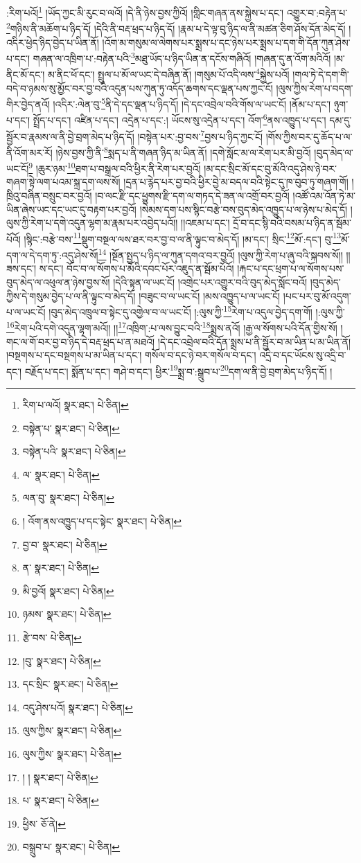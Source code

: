 :རིག་པའོ།\footnote{རིག་པ་ལའོ།  སྣར་ཐང་།  པེ་ཅིན། } །ཡོད་ཀྱང་མི་རུང་བ་ལའོ། །དེ་ནི་ཉེས་བྱས་ཀྱིའོ། །གླིང་གཞན་ནས་སྐྱེས་པ་དང་། འགྱུར་བ་:བརྟེན་པ་\footnote{བསྟེན་པ་  སྣར་ཐང་།  པེ་ཅིན། }གཉིས་ནི་མཆོག་པ་ཉིད་དོ། །དེའི་ནི་བརྡ་ཕྲད་པ་ཉིད་དོ། །རྣམ་པ་དེ་ལྟ་བུ་ཉིད་ལ་ནི་མཚན་ཅིག་ཤོས་དོན་མེད་དོ། །འདིར་ཕྱེད་ཉིད་བྱེད་པ་ཡིན་ནོ། །འོག་མ་གསུམ་ལ་ལེགས་པར་སྨྲས་པ་དང་ཉེས་པར་སྨྲས་པ་དག་གི་དོན་ཀུན་ཤེས་པ་དང་། གཞན་ལ་འཁྲིག་པ་:བརྟེན་པའི་\footnote{བསྟེན་པའི་  སྣར་ཐང་།  པེ་ཅིན། }མཐུ་ཡོད་པ་ཉིད་ཡིན་ན་དངོས་གཞིའོ། །གཞན་དུ་ན་འོག་མའིའོ། །མ་ནིང་མོ་དང་། མ་ནིང་ཕོ་དང་། སྤྲུལ་པ་མོ་ལ་ཡང་དེ་བཞིན་ནོ། །གསུམ་པོ་འདི་ལས་\footnote{ལ་  སྣར་ཐང་།  པེ་ཅིན། }སྐྱེས་པའོ། །གལ་ཏེ་དེ་དག་གི་བདེ་བ་ཉམས་སུ་མྱོང་བར་བྱ་བའི་འདུན་པས་ཀུན་ཏུ་འདོད་ཆགས་དང་ལྡན་པས་ཀྱང་ངོ། །ལུས་ཀྱིས་རེག་པ་བདག་གིར་བྱེད་ནའོ། །འདིར་:ལེན་བུ་\footnote{ལན་བུ་  སྣར་ཐང་།  པེ་ཅིན། }ནི་དེ་དང་ལྡན་པ་ཉིད་དོ། །དེ་དང་འབྲེལ་བའི་གོས་ལ་ཡང་ངོ། །ནོམ་པ་དང་། ཉུག་པ་དང་། སྤྲོད་པ་དང་། འཛིན་པ་དང་། འདྲེན་པ་དང་:། ཡོངས་སུ་འདྲེན་པ་དང་། འོག་\footnote{།  འོག་ནས་འཁྱུད་པ་དང་སྟེང་  སྣར་ཐང་།  པེ་ཅིན། }ནས་འཁྱུད་པ་དང་། དམ་དུ་སྦྱོར་བ་རྣམས་ལ་ནི་བྱེ་བྲག་མེད་པ་ཉིད་དོ། །བསྟེན་པར་:བྱ་བས་\footnote{བྱ་བ་  སྣར་ཐང་།  པེ་ཅིན། }བྱས་པ་ཉིད་ཀྱང་ངོ། །གོས་ཀྱིས་བར་དུ་ཆོད་པ་ལ་ནི་འོག་མར་རོ། །ཉེས་བྱས་ཀྱི་ནི་\footnote{ན་  སྣར་ཐང་།  པེ་ཅིན། }སྨད་པ་ནི་གཞན་ཉིད་མ་ཡིན་ནོ། །དགེ་སློང་མ་ལ་རེག་པར་མི་བྱའོ། །བུད་མེད་ལ་ཡང་ངོ།\footnote{མི་བྱའོ།  སྣར་ཐང་།  པེ་ཅིན། } །ཆུར་ཉམ་\footnote{ཉམས་  སྣར་ཐང་།  པེ་ཅིན། }ཐག་པ་བསྒྲལ་བའི་ཕྱིར་ནི་རེག་པར་བྱའོ། །མ་དང་སྲིང་མོ་དང་བུ་མོའི་འདུ་ཤེས་ཉེ་བར་གཞག་སྟེ་ལག་པའམ་སྐྲ་དག་ལས་སོ། །དྲན་པ་རྙེད་པར་བྱ་བའི་ཕྱིར་བྱེ་མ་བདལ་བའི་སྟེང་དུ་ཁ་བུབ་ཏུ་གཞག་གོ། །ཁྲིའུ་བཞིན་བསྲུང་བར་བྱའོ། །བ་ལང་རྫི་དང་ཕྱུགས་རྫི་དག་ལ་གཏད་དེ་ཟན་ལ་འགྲོ་བར་བྱའོ། །འཚོ་འམ་འོན་ཏེ་མ་ཡིན་ཞེས་ཡང་དང་ཡང་དུ་བརྟག་པར་བྱའོ། །སེམས་དག་པས་སྙིང་བརྩེ་བས་བུད་མེད་འཁྱུད་པ་ལ་ཉེས་པ་མེད་དོ། །ལུས་ཀྱི་རེག་པ་དགེ་འདུན་ལྷག་མ་རྣམ་པར་འབྱེད་པའོ།། །།འཇམ་པ་དང་། དྲོ་བ་དང་སྙི་བའི་བསམ་པ་ཉིད་ན་སྦོམ་པོའོ། །སྙིང་:བརྩེ་བས་\footnote{རྩེ་བས་  པེ་ཅིན། }སྡུག་བསྔལ་ལས་ཐར་བར་བྱ་བ་ལ་ནི་ལྟུང་བ་མེད་དོ། །མ་དང་། སྲིང་\footnote{།བུ་  སྣར་ཐང་།  པེ་ཅིན། }མོ་:དང་། བུ་\footnote{དང་སྲིང་  སྣར་ཐང་།  པེ་ཅིན། }མོ་དག་ལ་དེ་དག་ཏུ་:འདུ་ཤེས་སོ།\footnote{འདུ་ཤེས་པའོ།  སྣར་ཐང་།  པེ་ཅིན། } །སྔོན་སྤྱད་པ་ཉིད་ལ་ཀུན་དགའ་བར་བྱའོ། །ལུས་ཀྱི་རེག་པ་ཞུ་བའི་སྐབས་སོ།། །།ཟས་དང་། ས་དང་། བོང་བ་ལ་སོགས་པ་མོའི་དབང་པོར་འཇུད་ན་སྦོམ་པོའོ། །རྐང་པ་དང་ཕྲག་པ་ལ་སོགས་པས་བུད་མེད་ལ་འཕུལ་ན་ཉེས་བྱས་སོ། །དེའི་སྟན་ལ་ཡང་ངོ། །འགྲེང་པར་འགྱུར་བའི་བུད་མེད་སློང་བའོ། །བུད་མེད་ཀྱིས་དེ་གསུམ་བྱེད་པ་ལ་ནི་ལྟུང་བ་མེད་དོ། །བཟུང་བ་ལ་ཡང་ངོ། །མས་འཁྱུད་པ་ལ་ཡང་ངོ། །པང་པར་བུ་མོ་འདུག་པ་ལ་ཡང་ངོ། །བུད་མེད་འཁྲུལ་བ་སྟེང་དུ་འགྱེལ་བ་ལ་ཡང་ངོ། །:ལུས་ཀྱི་\footnote{ལུས་ཀྱིས་  སྣར་ཐང་།  པེ་ཅིན། }རེག་པ་འདུལ་བྱེད་དག་གོ། །:ལུས་ཀྱི་\footnote{ལུས་ཀྱིས་  སྣར་ཐང་།  པེ་ཅིན། }རེག་པའི་དགེ་འདུན་ལྷག་མའོ།། །།\footnote{། །  སྣར་ཐང་།  པེ་ཅིན། }འཁྲིག་:པ་ལས་བྱུང་བའི་\footnote{པ་  སྣར་ཐང་།  པེ་ཅིན། }སྨྲས་ནའོ། །རྒྱ་ལ་སོགས་པའི་དོན་གྱིས་སོ། །གང་ལ་གོ་བར་བྱ་བ་ཉིད་དེ་བརྡ་ཕྲད་པ་ན་མཐའོ། །དེ་དང་འབྲེལ་བའི་དོན་སྨྲས་པ་ནི་སྦྱོར་བ་མ་ཡིན་པ་མ་ཡིན་ནོ། །བསྔགས་པ་དང་བསྔགས་པ་མ་ཡིན་པ་དང་། གསོལ་བ་དང་ཉེ་བར་གསོལ་བ་དང་། འདྲི་བ་དང་ཡོངས་སུ་འདྲི་བ་དང་། བརྗོད་པ་དང་། སྨོན་པ་དང་། གཤེ་བ་དང་། ཕྱིར་\footnote{ཕྱིས་  ཅོ་ནེ། }སྨྲ་བ་:སྒྲུབ་པ་\footnote{བསྒྲུབ་པ་  སྣར་ཐང་།  པེ་ཅིན། }དག་ལ་ནི་བྱེ་བྲག་མེད་པ་ཉིད་དོ། །
